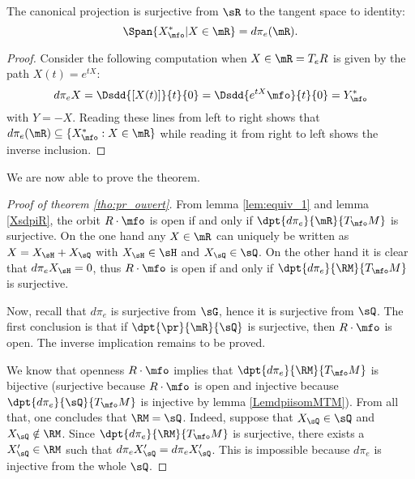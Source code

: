 \begin{lemma}
The canonical projection is surjective from $\sR$ to the tangent space to identity:
\begin{equation}\label{eq:equiv_2}
    \Span\{X^*_{\mfo}|X\in\mR\}=d\pi_e(\mR).
\end{equation}

\label{XsdpiR}

\end{lemma}

\begin{proof}
 Consider the following computation when $X\in\mR=T_eR$ is given by the path $X(t)=e^{tX}$:
\begin{equation}
  d\pi_e X=\Dsdd{[X(t)]}{t}{0}
	=\Dsdd{e^{tX}\mfo}{t}{0}
	=Y^*_{\mfo}
\end{equation}
with $Y=-X$. Reading these lines from left to right shows that $d\pi_e(\mR)\subseteq\{X^*_{\mfo}:X\in\mR\}$ while reading it from right to left shows the inverse inclusion.
\end{proof}


We are now able to prove the theorem.

\begin{proof}[Proof of theorem \ref{tho:pr_ouvert}]
From lemma \ref{lem:equiv_1} and lemma \ref{XsdpiR}, the orbit $R\cdot\mfo$ is open if and only if $\dpt{d\pi_e}{\mR}{T_{\mfo}M}$ is surjective. On the one hand any $X\in\mR$ can uniquely be written as $X=X_{\sH}+X_{\sQ}$ with $X_{\sH}\in\sH$ and $X_{\sQ}\in\sQ$. On the other hand it is clear that $d\pi_e X_{\sH}=0$, thus $R\cdot\mfo$ is open if and only if $\dpt{d\pi_e}{\RM}{T_{\mfo}M}$ is surjective.

Now, recall that $d\pi_e$ is surjective from $\sG$, hence it is surjective from $\sQ$. The first conclusion is that if $\dpt{\pr}{\mR}{\sQ}$ is surjective, then $R\cdot\mfo$ is open. The inverse implication remains to be proved.

We know that openness $R\cdot\mfo$ implies that $\dpt{d\pi_e}{\RM}{T_{\mfo}M}$ is bijective (surjective because $R\cdot\mfo$ is open and injective because $\dpt{d\pi_e}{\sQ}{T_{\mfo}M}$ is injective by lemma \ref{LemdpiisomMTM}). From all that, one concludes that $\RM=\sQ$. Indeed,  suppose that $X_{\sQ}\in\sQ$ and $X_{\sQ}\notin\RM$. Since $\dpt{d\pi_e}{\RM}{T_{\mfo}M}$ is surjective, there exists a $X_{\sQ}'\in\RM$ such that $d\pi_eX_{\sQ}'=d\pi_eX_{\sQ}'$. This is impossible because $d\pi_e$ is injective from the whole $\sQ$.

\end{proof}


